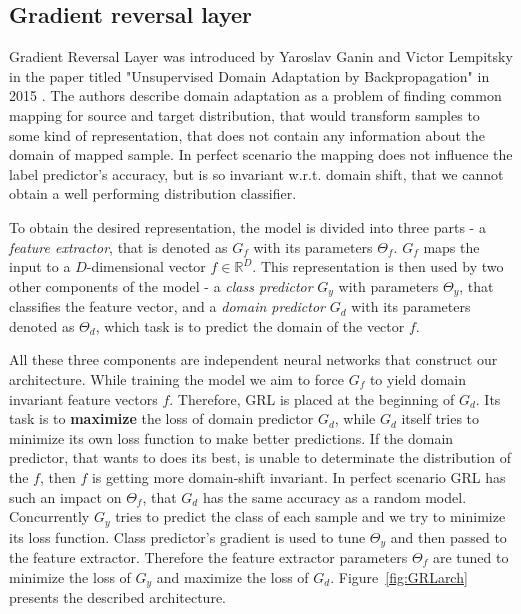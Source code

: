 \documentclass{article}
\begin{document}
\subsection{Gradient reversal layer}
Gradient Reversal Layer was introduced by Yaroslav Ganin and Victor Lempitsky in the paper titled "Unsupervised Domain Adaptation by Backpropagation" in 2015 \cite{pmlr-v37-ganin15}. The authors describe domain adaptation as a problem of finding common mapping for source and target distribution, that would transform samples to some kind of representation, that does not contain any information about the domain of mapped sample. In perfect scenario the mapping does not influence the label predictor's accuracy, but is so invariant w.r.t. domain shift, that we cannot obtain a well performing distribution classifier.

\par
To obtain the desired representation, the model is divided into three parts - a \textit{feature extractor}, that is denoted as $G_{f}$ with its parameters $\Theta_{f}$. $G_{f}$ maps the input to a $D$-dimensional vector $f \in \mathbb{R}^{D}$. This representation is then used by two other components of the model - a \textit{class predictor} $G_{y}$ with parameters $\Theta_{y}$, that classifies the feature vector, and a \textit{domain predictor} $G_{d}$ with its parameters denoted as $\Theta_{d}$, which task is to predict the domain of the vector $f$.
\par
All these three components are independent neural networks that construct our architecture. While training the model we aim to force $G_{f}$ to yield domain invariant feature vectors $f$. Therefore,  GRL is placed at the beginning of $G_{d}$. Its task is to \textbf{maximize} the loss of domain predictor $G_{d}$, while $G_{d}$ itself tries to minimize its own loss function to make better predictions. If the domain predictor, that wants to does its best, is unable to determinate the distribution of the $f$, then $f$ is getting more domain-shift invariant. In perfect scenario GRL has such an impact on $\Theta_{f}$, that $G_{d}$ has the same accuracy as a random model. Concurrently $G_{y}$ tries to predict the class of each sample and we try to minimize its loss function. Class predictor's gradient is used to tune $\Theta_{y}$ and then passed to the feature extractor. Therefore the feature extractor parameters $\Theta_{f}$ are tuned to minimize the loss of $G_{y}$ and maximize the loss of $G_{d}$. Figure~\ref{fig:GRLarch} presents the described architecture.
\end{document}
